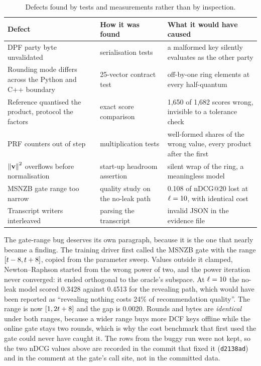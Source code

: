 \begin{table}[t]
\centering
\small
\caption{Defects found by tests and measurements rather than by inspection.}
\label{tab:bugs}
\begin{tabular}{@{}p{4.3cm} p{4.4cm} p{5.8cm}@{}}
\toprule
Defect & How it was found & What it would have caused \\
\midrule
DPF party byte unvalidated & serialisation tests & a malformed key silently
  evaluates as the other party \\
Rounding mode differs across the Python and C++ boundary & 25-vector contract
  test & off-by-one ring elements at every half-quantum \\
Reference quantised the product, protocol the factors & exact score comparison &
  1{,}650 of 1{,}682 scores wrong, invisible to a tolerance check \\
PRF counters out of step & multiplication tests & well-formed shares of the wrong
  value, every product after the first \\
$\left\lVert\mathbf{v}\right\rVert^2$ overflows before normalisation & start-up headroom
  assertion & silent wrap of the ring, a meaningless model \\
MSNZB gate range too narrow & quality study on the no-leak path & 0.108 of
  nDCG@20 lost at $\ell = 10$, with identical cost \\
Transcript writers interleaved & parsing the transcript & invalid JSON in the
  evidence file \\
\bottomrule
\end{tabular}
\end{table}

The gate-range bug deserves its own paragraph, because it is the one that nearly
became a finding. The training driver first called the MSNZB gate with the range
$[t - 8, t + 8]$, copied from the parameter sweep. Values outside
it clamped, Newton--Raphson started from the wrong power of two, and the power
iteration never converged: it ended orthogonal to the oracle's subspace. At
$\ell = 10$ the no-leak model scored 0.3428 against 0.4513 for the revealing
path, which would have been reported as ``revealing nothing costs 24\% of
recommendation quality''. The range is now $[1, 2t + 8]$ and the gap is
0.0020. Rounds and bytes are \emph{identical} under both ranges, because a wider
range buys more DCF keys offline while the online gate stays two rounds, which is
why the cost benchmark that first used the gate could never have caught it. The
rows from the buggy run were not kept, so the two nDCG values above are recorded
in the commit that fixed it (\texttt{d2138ad}) and in the comment at the gate's
call site, not in the committed data.
